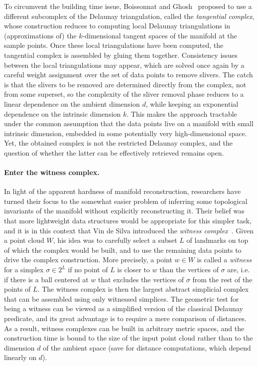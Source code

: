 To circumvent the building time issue, Boissonnat and
Ghosh~\cite{bg-mrtc-10} proposed to use a different subcomplex of the
Delaunay triangulation, called the {\em tangential complex}, whose
construction reduces to computing local Delaunay triangulations in
(approximations of) the $k$-dimensional tangent spaces of the manifold
at the sample points. Once these local triangulations have been
computed, the tangential complex is assembled by gluing them
together. Consistency issues between the local triangulations may
appear, which are solved once again by a careful weight assignment
over the set of data points to remove slivers. The catch is that the
slivers to be removed are determined directly from the complex, not
from some superset, so the complexity of the sliver removal phase
reduces to a linear dependence on the ambient dimension $d$, while
keeping an exponential dependence on the intrinsic dimension $k$. This
makes the approach tractable under the common assumption that the data
points live on a manifold with small intrinsic dimension, embedded in
some potentially very high-dimensional space. Yet, the obtained
complex is not the restricted Delaunay complex, and the question of
whether the latter can be effectively retrieved remains
open.


\paragraph*{Enter the witness complex.}
In light of the apparent hardness of manifold reconstruction,
researchers have turned their focus to the somewhat easier problem of
inferring some topological invariants of the manifold without
explicitly reconstructing it. Their belief was that more lightweight
data structures would be appropriate for this simpler task, and it is
in this context that Vin de Silva introduced the {\em witness
  complex}~\cite{vds-wdt-08}. Given a point cloud $W$, his idea was to
carefully select a subset $L$ of landmarks on top of which the complex
would be built, and to use the remaining data points to drive the
complex construction. More precisely, a point $w\in W$ is called a
{\em witness} for a simplex $\sigma \in 2^L$ if no point of $L$ is
closer to $w$ than the vertices of $\sigma$ are, i.e. if there is a ball
centered at $w$ that excludes the vertices of $\sigma$ from the rest
of the points of $L$. The witness complex is then the largest abstract
simplicial complex that can be assembled using only witnessed
simplices. The geometric test for being a witness can be viewed
as a simplified version of the classical Delaunay predicate, and its great
advantage is to require a mere comparison of distances. As a result, 
witness complexes can be built in arbitrary metric spaces, and the
construction time is bound to the size of the input point cloud rather
than to the dimension $d$ of the ambient space (save for distance
computations, which depend linearly on $d$).

